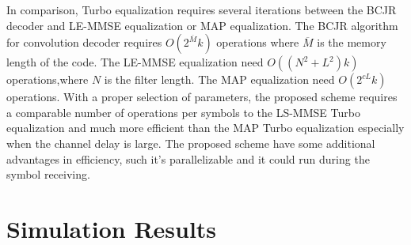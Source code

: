 \documentclass[conference]{IEEEtran}
\begin{document}
In comparison,  Turbo equalization requires several iterations between the BCJR \cite{1055186} decoder and LE-MMSE equalization or MAP equalization. The BCJR algorithm for convolution decoder requires $O(2^{\overline{M}}k)$ operations where $\overline{M}$ is the memory length of the code. The LE-MMSE equalization need $O((N^2+L^2)k)$ operations,where $N$ is the filter length. The MAP equalization need $O(2^{cL}k)$ operations. 
%
%
%
%
With a proper selection of parameters, the proposed scheme requires a comparable number of operations per symbols to the LS-MMSE Turbo equalization and much more efficient than the MAP Turbo equalization especially when the channel delay is large. The proposed scheme have some additional advantages in efficiency, such it's parallelizable and it could run during the symbol receiving.
\section{Simulation Results}
\end{document}
